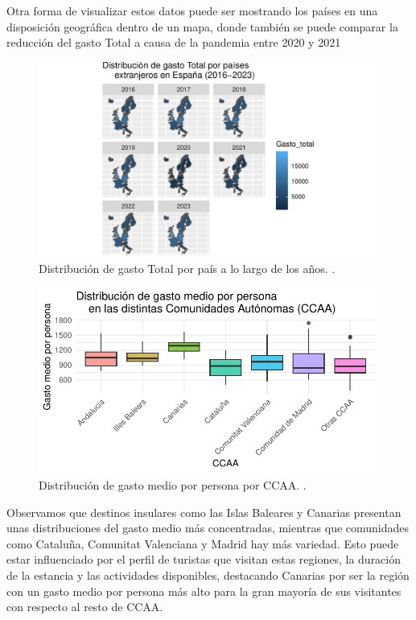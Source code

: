 \documentclass[data,article,submit,moreauthors,pdftex]{Definitions/mdpi}
\begin{document}
Otra forma de visualizar estos datos puede ser mostrando los países en
una disposición geográfica dentro de un mapa, donde también se puede
comparar la reducción del gasto Total a causa de la pandemia entre 2020
y 2021

\begin{figure}[H]
\includegraphics{ProyectoAED2024_Rmd_files/figure-latex/unnamed-chunk-27-1} \caption{Distribución de gasto Total por país a lo largo de los años. .\label{fig:geografGastoTotal}}\label{fig:unnamed-chunk-27}
\end{figure}

\begin{figure}[H]
\includegraphics{ProyectoAED2024_Rmd_files/figure-latex/unnamed-chunk-28-1} \caption{Distribución de gasto medio por persona por CCAA. .\label{fig:cajas}}\label{fig:unnamed-chunk-28}
\end{figure}

Observamos que destinos insulares como las Islas Baleares y Canarias
presentan unas distribuciones del gasto medio más concentradas, mientras
que comunidades como Cataluña, Comunitat Valenciana y Madrid hay más
variedad. Esto puede estar influenciado por el perfil de turistas que
visitan estas regiones, la duración de la estancia y las actividades
disponibles, destacando Canarias por ser la región con un gasto medio
por persona más alto para la gran mayoría de sus visitantes con respecto
al resto de CCAA.
\end{document}
